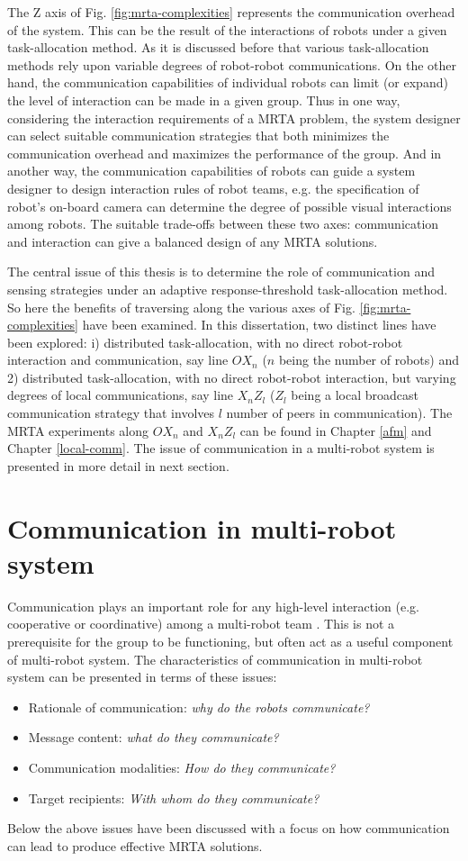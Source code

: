 The Z axis of Fig. \ref{fig:mrta-complexities} represents the communication overhead of the system. This can be the result of the interactions  of robots under a given task-allocation method. As it is discussed before that various task-allocation methods rely upon variable degrees of robot-robot communications.  On the other hand, the communication capabilities of individual robots can limit (or expand) the level of interaction can be made  in a given group. Thus in one way, considering the interaction requirements of a MRTA problem, the system designer can  select suitable communication strategies that both minimizes the communication overhead and maximizes the performance of the group. And in another way, the communication capabilities of robots can guide a system designer to design interaction rules of robot teams, e.g. the specification of robot's on-board camera  can determine the degree of possible visual interactions among robots. The suitable trade-offs between these two axes: communication and interaction can give  a balanced design of any MRTA solutions.

The central issue of this thesis is to determine the role of communication and sensing strategies under an adaptive response-threshold task-allocation method. So here the benefits of traversing along the various axes of Fig. \ref{fig:mrta-complexities} have been examined. In this dissertation, two distinct lines have been explored: i) distributed task-allocation, with no direct robot-robot interaction and communication, say line $OX_{n}$ ($n$ being the number of robots)  and 2) distributed task-allocation, with no direct robot-robot interaction, but varying degrees of local communications, say line $X_{n}Z_{l}$  ($Z_{l}$ being a local broadcast communication strategy that involves $l$ number of peers in communication). The MRTA experiments along $OX_{n}$ and $X_{n}Z_{l}$ can be found in Chapter \ref{afm} and Chapter \ref{local-comm}. The issue of  communication in a multi-robot system is presented in more detail in next section.
\section{Communication in multi-robot system}
\label{bg:mrs-comm}
Communication plays an important role for any high-level interaction (e.g. cooperative or coordinative) among a multi-robot team \cite{Arkin1998}. This is not a prerequisite for the group to be functioning, but often act as a useful component of multi-robot system. The characteristics of communication in multi-robot system can be presented in terms of these issues:
\begin{itemize}
\item Rationale of communication: {\em why do the robots communicate?} 
\item Message content: {\em what do they communicate?} 
\item Communication modalities: {\em How do they communicate?} 
\item Target recipients: {\em With whom do they communicate?}
\end{itemize}
Below the above issues have been discussed with a focus on how communication  can lead to produce effective MRTA solutions.
